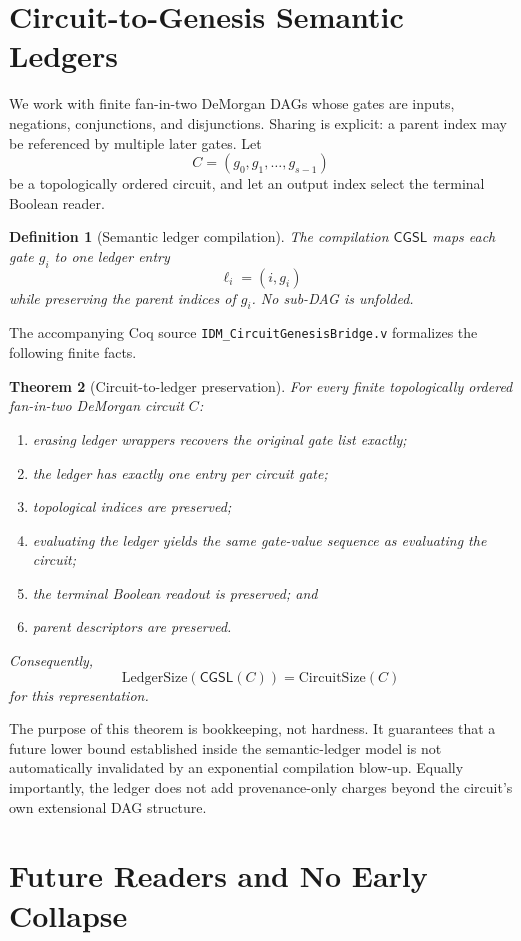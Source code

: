 \documentclass[11pt]{article}
\newtheorem{theorem}{Theorem}[section]
\newtheorem{definition}[theorem]{Definition}
\newcommand{\CircuitSize}{\mathrm{CircuitSize}}
\newcommand{\LedgerSize}{\mathrm{LedgerSize}}
\begin{document}
\section{Circuit-to-Genesis Semantic Ledgers}

We work with finite fan-in-two DeMorgan DAGs whose gates are inputs, negations, conjunctions, and disjunctions. Sharing is explicit: a parent index may be referenced by multiple later gates. Let
\[
C=(g_0,g_1,\ldots,g_{s-1})
\]
be a topologically ordered circuit, and let an output index select the terminal Boolean reader.

\begin{definition}[Semantic ledger compilation]
The compilation $\mathsf{CGSL}$ maps each gate $g_i$ to one ledger entry
\[
\ell_i=(i,g_i)
\]
while preserving the parent indices of $g_i$. No sub-DAG is unfolded.
\end{definition}

The accompanying Coq source \texttt{IDM\_CircuitGenesisBridge.v} formalizes the following finite facts.

\begin{theorem}[Circuit-to-ledger preservation]
For every finite topologically ordered fan-in-two DeMorgan circuit $C$:
\begin{enumerate}
  \item erasing ledger wrappers recovers the original gate list exactly;
  \item the ledger has exactly one entry per circuit gate;
  \item topological indices are preserved;
  \item evaluating the ledger yields the same gate-value sequence as evaluating the circuit;
  \item the terminal Boolean readout is preserved; and
  \item parent descriptors are preserved.
\end{enumerate}
Consequently,
\[
\LedgerSize(\mathsf{CGSL}(C))=\CircuitSize(C)
\]
for this representation.
\end{theorem}

The purpose of this theorem is bookkeeping, not hardness. It guarantees that a future lower bound established inside the semantic-ledger model is not automatically invalidated by an exponential compilation blow-up. Equally importantly, the ledger does not add provenance-only charges beyond the circuit's own extensional DAG structure.

\section{Future Readers and No Early Collapse}
\end{document}
